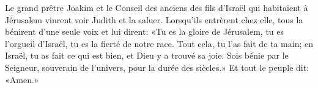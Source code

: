 Le grand prêtre Joakim
		et le Conseil des anciens des fils d’Israël qui habitaient à Jérusalem
	vinrent voir Judith et la saluer.
Lorsqu’ils entrèrent chez elle, tous la bénirent d’une seule voix et lui dirent:
	«Tu es la gloire de Jérusalem, tu es l’orgueil d’Israël,
	tu es la fierté de notre race.
Tout cela, tu l’as fait de ta main;
	en Israël, tu as fait ce qui est bien, et Dieu y a trouvé sa joie.
Sois bénie par le Seigneur, souverain de l’univers, pour la durée des siècles.»
	Et tout le peuple dit: «Amen.»
